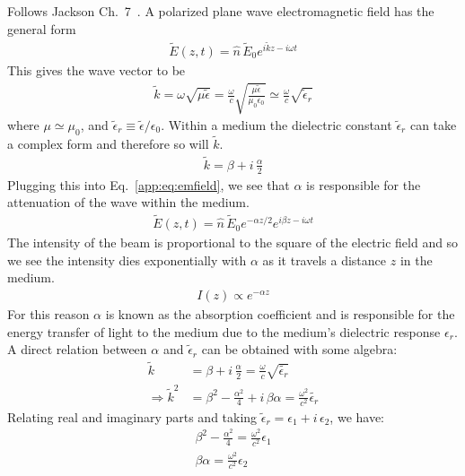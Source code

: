 Follows Jackson Ch.\ 7~\cite{jackson1999}. A polarized plane wave electromagnetic field has the general form
\begin{align}
    \tilde{E}(z,t)=\hat{n}\,\tilde{E}_{0}e^{i\tilde{k}z-i\omega t}
    \label{app:eq:emfield}
\end{align}
This gives the wave vector to be
\begin{align}
    \tilde{k}=\omega\sqrt{\mu\tilde{\epsilon}}=\frac{\omega}{c}\sqrt{\frac{\mu\tilde{\epsilon}}{\mu_0\epsilon_0}}\simeq \frac{\omega}{c}\sqrt{\tilde{\epsilon}_r}
\end{align}
where $\mu \simeq \mu_0$, and $\tilde{\epsilon}_r \equiv \tilde{\epsilon}/\epsilon_0$. Within a medium the dielectric constant $\tilde{\epsilon}_r$ can take a complex form and therefore so will $\tilde{k}$.
\begin{align}
    \tilde{k}= \beta + i \,\frac{\alpha}{2}
\end{align}
Plugging this into Eq.~\ref{app:eq:emfield}, we see that $\alpha$ is responsible for the attenuation of the wave within the medium.
\begin{align}
    \tilde{E}(z,t)=\hat{n}\,\tilde{E}_{0}e^{-\alpha z/2} e^{i\beta z-i\omega t}
\end{align}
The intensity of the beam is proportional to the square of the electric field and so we see the intensity dies exponentially with $\alpha$ as it travels a distance $z$ in the medium.
\begin{align}
    I(z)\propto e^{-\alpha z}
\end{align}
For this reason $\alpha$ is known as the absorption coefficient and is responsible for the energy transfer of light to the medium due to the medium's dielectric response $\epsilon_r$. A direct relation between $\alpha$ and $\tilde{\epsilon}_r$ can be obtained with some algebra:
\begin{align}
    \tilde{k} &= \beta + i \, \frac{\alpha}{2} = \frac{\omega}{c}\sqrt{\tilde{\epsilon_r}} \\
    \Rightarrow \tilde{k}^2 &= \beta^2 - \frac{\alpha^2}{4} + i\, \beta\alpha = \frac{\omega^2}{c^2}\tilde{\epsilon_r}
\end{align}
Relating real and imaginary parts and taking $\tilde{\epsilon}_r=\epsilon_1+i\,\epsilon_2$, we have:
\begin{align}
    \beta^2 - \frac{\alpha^2}{4} = \frac{\omega^2}{c^2}\epsilon_1 \\
    \beta\alpha = \frac{\omega^2}{c^2}\epsilon_2
\end{align}
